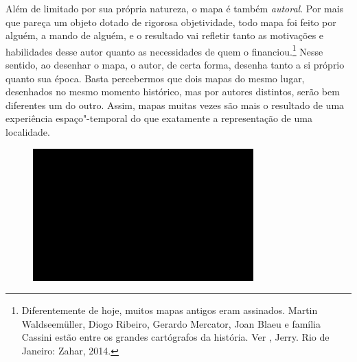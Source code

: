 Além de limitado por sua própria natureza, o mapa é também
\emph{autoral}. Por mais que pareça um objeto dotado de rigorosa
objetividade, todo mapa foi feito por alguém, a mando de alguém, e o
resultado vai refletir tanto as motivações e habilidades desse autor
quanto as necessidades de quem o financiou.\footnote{Diferentemente de
  hoje, muitos mapas antigos eram assinados. Martin Waldseemüller, Diogo
  Ribeiro, Gerardo Mercator, Joan Blaeu e família Cassini estão entre os
  grandes cartógrafos da história. Ver , Jerry. {} Rio de Janeiro: Zahar, 2014.} Nesse
sentido, ao desenhar o mapa, o autor, de certa forma, desenha
tanto a si próprio quanto sua época. Basta percebermos que dois mapas do mesmo lugar,
desenhados no mesmo momento histórico, mas por autores distintos, serão
bem diferentes um do outro. Assim, mapas muitas vezes são mais o
resultado de uma experiência espaço"-temporal do que exatamente a
representação de uma localidade.

\begin{figure}[!ht]

\centering
 \includegraphics[width=85mm]{./imgs/im1.jpg}
\caption{\tiny{}}

\end{figure}

